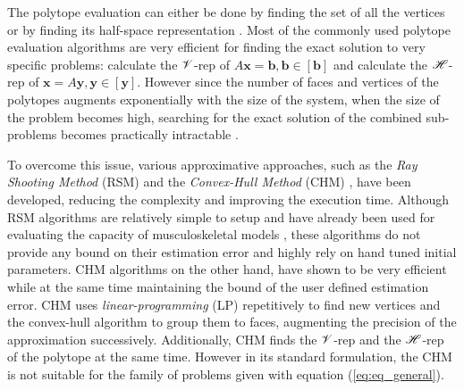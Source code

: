 
The polytope evaluation can either be done by finding the set of all the vertices  or by finding its half-space representation . Most of the commonly used polytope evaluation algorithms are very efficient for finding the exact solution to very specific problems: \cite{fukuda_dd}\cite{skuric:hal-02993408}\cite{sasaki2011vertex} calculate the $\mathscr{V}$-rep of $A\bm{x}\!=\!\bm{b},\bm{b}\!\in\![\bm{b}]$ and \cite{hyper_psm}\cite{dantzig1973fourier}\cite{jones2004equality} calculate the $\mathscr{H}$-rep of $\bm{x}\!=\! A\bm{y},\bm{y}\!\in\![\bm{y}]$. However since the number of faces and vertices of the polytopes augments exponentially with the size of the system, when the size of the problem becomes high, searching for the exact solution of the combined sub-problems becomes practically intractable \cite{Huynh2005PracticalIO}. 

To overcome this issue, various approximative approaches, such as the  \textit{Ray Shooting Method} (RSM)  \cite{agarwal1993ray} and the \textit{Convex-Hull Method} (CHM) \cite{lassez1992quantifier}, have been developed, reducing the complexity and improving the execution time. 
Although RSM algorithms are relatively simple to setup and have already been used for evaluating the capacity of musculoskeletal models \cite{carmichael2011Towards}, these algorithms do not provide any bound on their estimation error and highly rely on hand tuned initial parameters. 
CHM \cite{lassez1992quantifier} algorithms on the other hand, have shown to be very efficient while at the same time maintaining the bound of the user defined estimation error. CHM uses  \textit{linear-programming} (LP) repetitively to find new vertices and the convex-hull algorithm to group them to faces, augmenting the precision of the approximation successively. Additionally, CHM finds the $\mathscr{V}$-rep and the $\mathscr{H}$-rep of the polytope at the same time.  However in its standard formulation, the CHM is not suitable for the family of problems given with equation (\ref{eq:eq_general}). 

